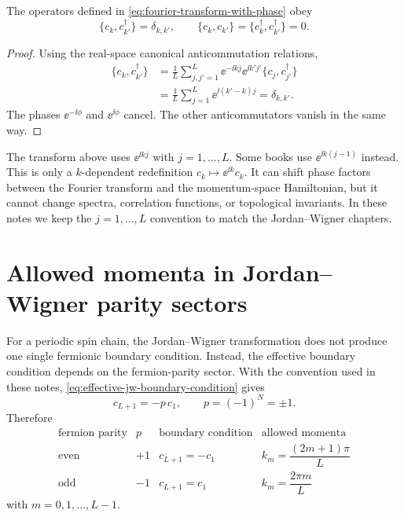 \begin{proposition}
The operators defined in \cref{eq:fourier-transform-with-phase} obey
\begin{equation}
    \{c_k,c_{k'}^\dagger\}=\delta_{k,k'},
    \qquad
    \{c_k,c_{k'}\}=\{c_k^\dagger,c_{k'}^\dagger\}=0 .
\end{equation}
\end{proposition}

\begin{proof}
Using the real-space canonical anticommutation relations,
\begin{align}
    \{c_k,c_{k'}^\dagger\}
    &=
    \frac{1}{L}
    \sum_{j,j'=1}^{L}
    \ee^{-\ii k j}\ee^{\ii k'j'}
    \{c_j,c_{j'}^\dagger\}
    \nonumber\\
    &=
    \frac{1}{L}\sum_{j=1}^{L}\ee^{\ii(k'-k)j}
    =
    \delta_{k,k'}.
\end{align}
The phases $\ee^{-\ii\phi}$ and $\ee^{\ii\phi}$ cancel.  The other
anticommutators vanish in the same way.
\end{proof}

\begin{remark}
The transform above uses $\ee^{\ii k j}$ with $j=1,\ldots,L$.  Some books use
$\ee^{\ii k(j-1)}$ instead.  This is only a $k$-dependent redefinition
$c_k\mapsto \ee^{\ii k}c_k$.  It can shift phase factors between the Fourier
transform and the momentum-space Hamiltonian, but it cannot change spectra,
correlation functions, or topological invariants.  In these notes we keep the
$j=1,\ldots,L$ convention to match the Jordan--Wigner chapters.
\end{remark}

\section{Allowed momenta in Jordan--Wigner parity sectors}

For a periodic spin chain, the Jordan--Wigner transformation does not produce one
single fermionic boundary condition.  Instead, the effective boundary condition
depends on the fermion-parity sector.  With the convention used in these notes,
\cref{eq:effective-jw-boundary-condition} gives
\begin{equation}
    c_{L+1}=-p\,c_1,
    \qquad
    p=(-1)^N=\pm1.
\end{equation}
Therefore
\begin{equation}
\label{eq:jw-parity-momentum-sectors}
\begin{array}{c|c|c|c}
    \text{fermion parity} & p & \text{boundary condition} & \text{allowed momenta} \\
    \hline
    \text{even} & +1 & c_{L+1}=-c_1
    & k_m=\dfrac{(2m+1)\pi}{L} \\
    \text{odd} & -1 & c_{L+1}=c_1
    & k_m=\dfrac{2\pi m}{L}
\end{array}
\end{equation}
with $m=0,1,\ldots,L-1$.

